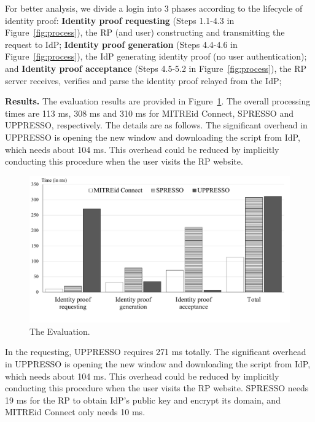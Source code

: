 For better analysis, we divide a login into 3 phases according to the lifecycle of identity proof:
 \textbf{Identity proof requesting} (Steps 1.1-4.3 in Figure~\ref{fig:process}), the RP (and user) constructing and transmitting the request to IdP;
 \textbf{Identity proof generation} (Steps 4.4-4.6 in Figure~\ref{fig:process}), the IdP generating identity proof (no user authentication);
and  \textbf{Identity proof acceptance} (Steps 4.5-5.2 in Figure~\ref{fig:process}), the RP server receives, verifies and parse the identity proof relayed from the IdP;

\noindent\textbf{Results.}
The evaluation results are provided in Figure~\ref{fig:evaluation}.
The overall processing times are  113 ms, 308 ms and 310 ms for MITREid Connect, SPRESSO and UPPRESSO, respectively. The details are as follows.
The significant overhead  in UPPRESSO is opening the new window and downloading the script from IdP, which needs about 104 ms. This overhead could be reduced by implicitly conducting this procedure when the user visits the RP website.


\begin{figure}
  \centering
  \includegraphics[width=0.9\linewidth]{fig/evaluation2.pdf}
  \vspace{-6mm}
  \caption{The Evaluation.}
  \label{fig:evaluation}
\vspace{-7mm}
\end{figure}

In the requesting, UPPRESSO requires  271 ms totally.
The significant overhead  in UPPRESSO is opening the new window and downloading the script from IdP, which needs about 104 ms. This overhead could be reduced by implicitly conducting this procedure when the user visits the RP website.
SPRESSO needs 19 ms for the RP to obtain IdP's public key and encrypt its domain,
and MITREid Connect only needs 10 ms.



